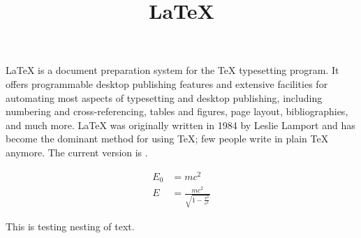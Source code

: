 \documentclass{article} %
\title{\LaTeX} %
\begin{document}
  \maketitle
  \LaTeX{} is a document preparation system for
  the \TeX{} typesetting program. It offers
  programmable desktop publishing features and
  extensive facilities for automating most
  aspects of typesetting and desktop publishing,
  including numbering and  cross-referencing,
  tables and figures, page layout,
  bibliographies, and much more. \LaTeX{} was
  originally written in 1984 by Leslie Lamport
  and has become the  dominant method for using
  \TeX; few people write in plain \TeX{} anymore.
  The current version is \LaTeXe.

  \begin{align}
    E_0 &= mc^2 \\
    E &= \frac{mc^2}{\sqrt{1-\frac{v^2}{c^2}}}
  \end{align} 

  This is testing {nesting {of {text}}}.
\end{document}
